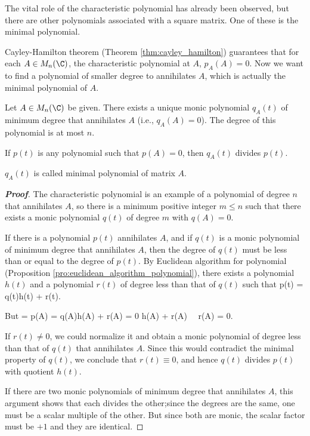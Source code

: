 The vital role of the characteristic polynomial has already been observed, but there are other polynomials associated with a square matrix. One of these is the minimal polynomial.

Cayley-Hamilton theorem (Theorem \ref{thm:cayley_hamilton}) guarantees that for each $A\in M_n(\C)$, the characteristic polynomial at $A$, $p_A(A) = 0$. Now we want to find a polynomial of smaller
degree to annihilates $A$, which is actually the minimal polynomial of $A$.

\begin{theorem}\label{thm:minimal_polynomial_existence_uniqueness}
Let $A\in M_n(\C)$ be given. There exists a unique monic polynomial $q_A(t)$ of minimum degree that annihilates $A$ (i.e., $q_A(A) = 0$). The degree of this polynomial is at most $n$.

If $p(t)$ is any polynomial such that $p(A) = 0$, then $q_A(t)$ divides $p(t)$.

$q_A(t)$ is called minimal polynomial of matrix $A$.
\end{theorem}

\begin{proof}[\bf Proof]
The characteristic polynomial is an example of a polynomial of degree $n$ that annihilates $A$, so there is a minimum positive integer $m\leq n$ such that there exists a monic polynomial $q(t)$ of
degree $m$ with $q(A) = 0$.

If there is a polynomial $p(t)$ annihilates $A$, and if $q(t)$ is a monic polynomial of minimum degree that annihilates $A$, then the degree of $q(t)$ must be less than or equal to the degree of
$p(t)$. By Euclidean algorithm for polynomial (Proposition \ref{pro:euclidean_algorithm_polynomial}), there exists a polynomial $h(t)$ and a polynomial $r(t)$ of degree less than that of $q(t)$ such
that
\be
p(t) = q(t)h(t) + r(t).
\ee

But
 = p(A) = q(A)h(A) + r(A) = 0 h(A) + r(A) \ \ra \ r(A) = 0.
\ee

If $r(t)\neq 0$, we could normalize it and obtain a monic polynomial of degree less than that of $q(t)$ that annihilates $A$. Since this would contradict the minimal property of $q(t)$, we conclude
that $r(t) \equiv 0$, and hence $q(t)$ divides $p(t)$ with quotient $h(t)$.

If there are two monic polynomials of minimum degree that annihilates $A$, this argument shows that each divides the other;since the degrees are the same, one must be a scalar multiple of the other.
But since both are monic, the scalar factor must be $+1$ and they are identical.
\end{proof}

